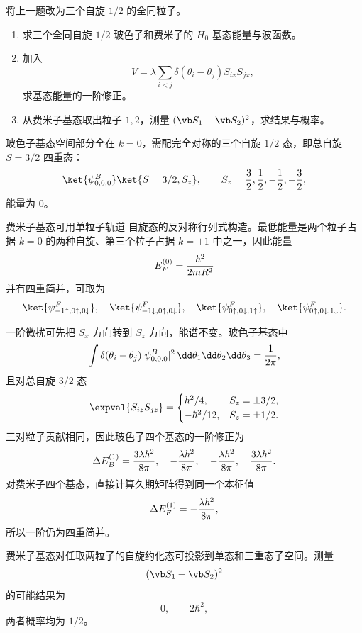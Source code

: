 \begin{question}
将上一题改为三个自旋 $1/2$ 的全同粒子。
\begin{enumerate}
  \item 求三个全同自旋 $1/2$ 玻色子和费米子的 $H_0$ 基态能量与波函数。
  \item 加入
  \[
  V=\lambda\sum_{i<j}\delta(\theta_i-\theta_j)S_{ix}S_{jx},
  \]
  求基态能量的一阶修正。
  \item 从费米子基态取出粒子 $1,2$，测量 $(\vb S_1+\vb S_2)^2$，求结果与概率。
\end{enumerate}
\begin{solution}
玻色子基态空间部分全在 $k=0$，需配完全对称的三个自旋 $1/2$ 态，即总自旋 $S=3/2$ 四重态：
\[
  \ket{\psi^{B}_{0,0,0}}\ket{S=3/2,S_z},\qquad S_z={3\over2},{1\over2},-{1\over2},-{3\over2},
\]
能量为 $0$。

费米子基态可用单粒子轨道-自旋态的反对称行列式构造。最低能量是两个粒子占据 $k=0$ 的两种自旋、第三个粒子占据 $k=\pm1$ 中之一，因此能量
\[
  E_F^{(0)}={\hbar^2\over2mR^2}
\]
并有四重简并，可取为
\[
  \ket{\psi^F_{-1\uparrow,0\uparrow,0\downarrow}},\quad
  \ket{\psi^F_{-1\downarrow,0\uparrow,0\downarrow}},\quad
  \ket{\psi^F_{0\uparrow,0\downarrow,1\uparrow}},\quad
  \ket{\psi^F_{0\uparrow,0\downarrow,1\downarrow}}.
\]

一阶微扰可先把 $S_x$ 方向转到 $S_z$ 方向，能谱不变。玻色子基态中
\[
  \int\delta(\theta_i-\theta_j)|\psi^{B}_{0,0,0}|^2\,\dd\theta_1\dd\theta_2\dd\theta_3={1\over2\pi},
\]
且对总自旋 $3/2$ 态
\[
  \expval{S_{iz}S_{jz}}=\begin{cases}
  \hbar^2/4,& S_z=\pm3/2,\\
  -\hbar^2/12,& S_z=\pm1/2.
  \end{cases}
\]
三对粒子贡献相同，因此玻色子四个基态的一阶修正为
\[
  \Delta E_B^{(1)}={3\lambda\hbar^2\over8\pi},\quad
  -{\lambda\hbar^2\over8\pi},\quad
  -{\lambda\hbar^2\over8\pi},\quad
  {3\lambda\hbar^2\over8\pi}.
\]
对费米子四个基态，直接计算久期矩阵得到同一个本征值
\[
  \Delta E_F^{(1)}=-{\lambda\hbar^2\over8\pi},
\]
所以一阶仍为四重简并。

费米子基态对任取两粒子的自旋约化态可投影到单态和三重态子空间。测量
\[
  (\vb S_1+\vb S_2)^2
\]
的可能结果为
\[
  0,\qquad 2\hbar^2,
\]
两者概率均为 $1/2$。
\end{solution}
\end{question}


